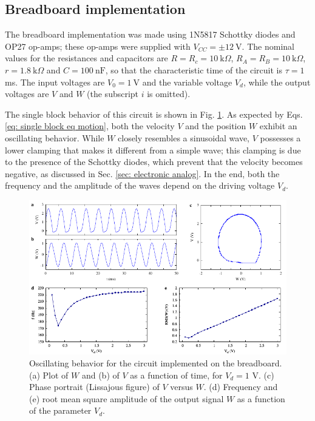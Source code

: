 \subsection{Breadboard implementation}
\label{subsec:breadboard implementation}

The breadboard implementation was made using 1N5817 Schottky diodes
and OP27 op-amps; these op-amps were
supplied with $V_{CC}=\pm12~\text{V}$. The nominal values for the
resistances and capacitors are $R=R_c=10~\text{k}\Omega$,
$R_A=R_B=10~\text{k}\Omega$, $r=1.8~\text{k}\Omega$ and
$C=100~\text{nF}$, so that the characteristic time of the circuit is $\tau=1$ ms.
The input voltages are $V_0=1~\text{V}$ and
the variable voltage $V_d$, while the output voltages are
$V$ and $W$ (the subscript $i$ is omitted).

The single block behavior of this circuit is shown in Fig. \ref{fig:oscillation breadboard}.
As expected by Eqs. \ref{eq: single block eq motion}, both the velocity $V$ and the position $W$
exhibit an oscillating behavior. While $W$ closely resembles a sinusoidal wave, $V$ possesses
a lower clamping that makes it different from a simple wave; this clamping is due
to the presence of the Schottky diodes, which prevent that the velocity becomes negative, as
discussed in Sec. \ref{sec: electronic analog}.
In the end, both the frequency and the amplitude of the waves depend on the driving voltage $V_d$.

\begin{figure}[H]
    \centering
    \includegraphics[width=\linewidth]{../1_block/breadboard/single_block.pdf}
    \caption{Oscillating behavior for the circuit implemented on
    the breadboard. (a) Plot of $W$ and (b) of $V$ as a function of time,
    for $V_d=1$ V.
    (c) Phase portrait (Lissajous figure) of $V$ versus $W$. (d)
    Frequency and (e) root mean square amplitude of the
    output signal $W$ as a function of the parameter $V_d$.}
    \label{fig:oscillation breadboard}
\end{figure}

